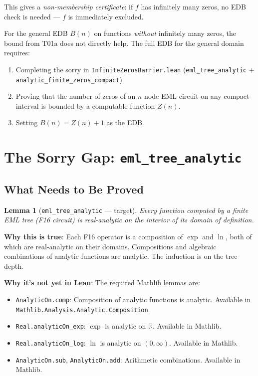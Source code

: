 \documentclass[12pt]{article}
\newtheorem{lemma}[theorem]{Lemma}
\theoremstyle{definition}
\begin{document}
This gives a \emph{non-membership certificate}: if $f$ has infinitely many zeros,
no EDB check is needed — $f$ is immediately excluded.

For the general EDB $B(n)$ on functions \emph{without} infinitely many zeros,
the bound from T01a does not directly help.  The full EDB for the general domain
requires:
\begin{enumerate}
  \item Completing the sorry in \texttt{InfiniteZerosBarrier.lean}
    (\texttt{eml\_tree\_analytic} + \texttt{analytic\_finite\_zeros\_compact}).
  \item Proving that the number of zeros of an $n$-node EML circuit on any
    compact interval is bounded by a computable function $Z(n)$.
  \item Setting $B(n) = Z(n) + 1$ as the EDB.
\end{enumerate}

\section{The Sorry Gap: \texttt{eml\_tree\_analytic}}

\subsection{What Needs to Be Proved}

\begin{lemma}[\texttt{eml\_tree\_analytic} — target]
Every function computed by a finite EML tree (F16 circuit) is real-analytic
on the interior of its domain of definition.
\end{lemma}

\textbf{Why this is true}: Each F16 operator is a composition of $\exp$ and
$\ln$, both of which are real-analytic on their domains.  Compositions and
algebraic combinations of analytic functions are analytic.  The induction is
on the tree depth.

\textbf{Why it's not yet in Lean}: The required Mathlib lemmas are:
\begin{itemize}
  \item \texttt{AnalyticOn.comp}: Composition of analytic functions is analytic.
    Available in \texttt{Mathlib.Analysis.Analytic.Composition}.
  \item \texttt{Real.analyticOn\_exp}: $\exp$ is analytic on $\mathbb{R}$.
    Available in Mathlib.
  \item \texttt{Real.analyticOn\_log}: $\ln$ is analytic on $(0, \infty)$.
    Available in Mathlib.
  \item \texttt{AnalyticOn.sub}, \texttt{AnalyticOn.add}: Arithmetic combinations.
    Available in Mathlib.
\end{itemize}
\end{document}
